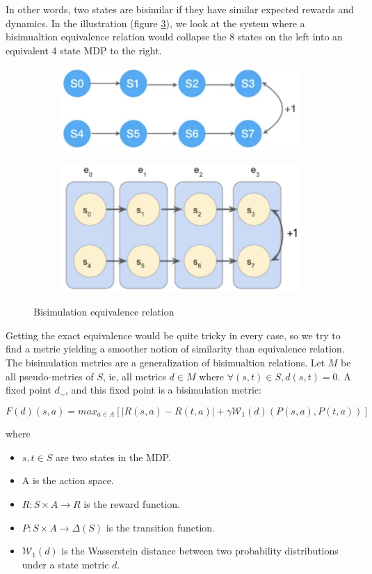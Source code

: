 \documentclass{usiinftr}
\begin{document}
In other words, two states are bisimilar if they have similar expected rewards and dynamics. In the illustration (figure \ref{fig:BisimulationEquivalence}), we look at the system where a bisimualtion equivalence relation would collapse the 8 states on the left into an equivalent 4 state MDP to the right.

\begin{figure}[h]
    \centering
    \begin{subfigure}
        \centering
        \includegraphics[width = 0.45\linewidth]{figures/image4.png}
        \label{}
    \end{subfigure}%
    \begin{subfigure}
        \centering
        \includegraphics[width = 0.5\linewidth]{figures/image5.png}
        \label{}
    \end{subfigure}
    \caption{Bisimulation equivalence relation \cite{pscsWebsite}}
    \label{fig:BisimulationEquivalence}
\end{figure}

Getting the exact equivalence would be quite tricky in every case, so we try to find a metric yielding a smoother notion of similarity than equivalence relation. The bisimulation metrics are a generalization of bisimualtion relations. Let $M$ be all pseudo-metrics of $S$, ie, all metrics $d \in M $ where $\forall (s,t) \in S, d(s,t)=0$.  A fixed point $d_{\sim}$, and this fixed point is a bisimulation metric:

\begin{equation}
    F(d)(s,a) = max_{a \in A} [|R(s,a) - R(t,a)| + \gamma \mathcal{W}_1 (d)(P(s,a),P(t,a))]
\end{equation}

where 
\begin{itemize}
    \item $s,t \in S$ are two states in the MDP.
    \item A is the action space.
    \item $R:S \times A \rightarrow R$ is the reward function.
    \item $P:S \times A \rightarrow \Delta(S)$ is the transition function.
    \item $\mathcal{W}_1 (d)$ is the Wasserstein distance between two probability distributions under a state metric $d$.
\end{itemize}
\cite{castro2020scalable}
\end{document}
